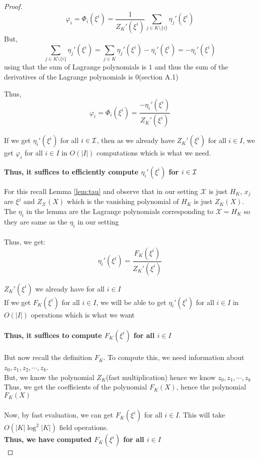 \begin{proof}
    $$\varphi_i =\Phi_i(\xi^i) =  \frac{1}{Z_K'(\xi^i)}\sum_{j\in K\setminus \{i\}}\eta_j'(\xi^i)$$
    But, $$\sum_{j\in K\setminus \{i\}}\eta_j'(\xi^i)= \sum_{j\in K}\eta_j'(\xi^i)-\eta_i'(\xi^i)=-\eta_i'(\xi^i)$$
    using that the sum of Lagrange polynomials is $1$ and thus the sum of the derivatives of the Lagrange polynomials is $0$(section A.1)

    Thus,
    $$\varphi_i =\Phi_i(\xi^i) = \frac{-\eta_i'(\xi^i)}{Z_K'(\xi^i)}$$

    If we get $\eta_i'(\xi^i)$ for all $i\in \mathcal{I}$, then as we already have $Z_K'(\xi^i)$ for all $i \in I$, we get $\varphi_i$ for all $i \in I$ in $O(|I|)$ computations which is what we need.


    \textbf{Thus, it suffices to efficiently compute $\eta_i'(\xi^i)$ for $i\in \mathcal{I}$}

    For this recall Lemma \ref{lem:tau} and observe that in our setting $\mathcal{X}$ is just $H_K$, $x_j$ are $\xi^j$ and $Z_\mathcal{X}(X)$ which is the vanishing polynomial of $H_K$ is just $Z_K(X)$. The $\eta_i$ in the lemma are the Lagrange polynomials corresponding to $\mathcal{X}=H_K$ so they are same as the $\eta_i$ in our setting\\\\
    Thus, we get:\\
    $$\eta_i'(\xi^i)=\frac{F_K(\xi^i)}{Z_K'(\xi^i)}$$

    $Z_K'(\xi^i)$ we already have for all $i \in I$\\
    If we get $F_K(\xi^i)$ for all $i \in I$, we will be able to get $\eta_i'(\xi^i)$ for all $i \in I$ in $O(|I|)$ operations which is what we want\\\\

    \textbf{Thus, it suffices to compute $F_K(\xi^i)$ for all $i \in I$}\\\\

    But now recall the definition $F_K$. To compute this, we need information about $z_0, z_1, z_2, \cdots, z_k$.\\
    But, we know the polynomial $Z_K$(fast multiplication) hence we know $z_0, z_1, \cdots, z_{k}$\\
    Thus, we get the coefficients of the polynomial $F_K(X)$, hence the polynomial $F_K(X)$\\\\
    Now, by fast evaluation, we can get $F_K(\xi^i)$ for all $i \in I$. This will take $O(|K| \log^2|K|)$ field operations. \\
    \textbf{Thus, we have computed $F_K(\xi^i)$ for all $i \in I$}\\


\end{proof}
